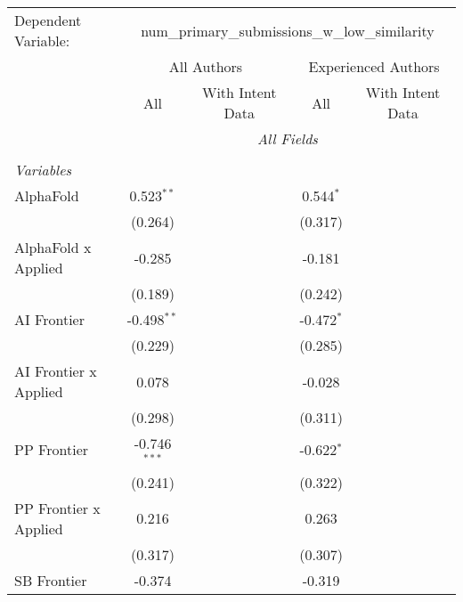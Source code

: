 \begingroup
\centering
\begin{tabular}{lcccccc}
   \tabularnewline \midrule \midrule
   Dependent Variable: & \multicolumn{6}{c}{num\_primary\_submissions\_w\_low\_similarity}\\
 & \multicolumn{3}{c}{All Authors} & \multicolumn{3}{c}{Experienced Authors} \\
\cmidrule(lr){2-4} \cmidrule(lr){5-7}
 & \multicolumn{1}{c}{All} & \multicolumn{2}{c}{With Intent Data} & \multicolumn{1}{c}{All} & \multicolumn{2}{c}{With Intent Data} \\
\cmidrule(lr){2-2} \cmidrule(lr){3-4} \cmidrule(lr){5-5} \cmidrule(lr){6-7}
 & \multicolumn{6}{c}{\textit{All Fields}} \\ \\
   \emph{Variables}\\
   AlphaFold             & 0.523$^{**}$   &         &         & 0.544$^{*}$  &        &   \\   
                         & (0.264)        &         &         & (0.317)      &        &   \\   
   AlphaFold x Applied   & -0.285         &         &         & -0.181       &        &   \\   
                         & (0.189)        &         &         & (0.242)      &        &   \\   
   AI Frontier           & -0.498$^{**}$  &         &         & -0.472$^{*}$ &        &   \\   
                         & (0.229)        &         &         & (0.285)      &        &   \\   
   AI Frontier x Applied & 0.078          &         &         & -0.028       &        &   \\   
                         & (0.298)        &         &         & (0.311)      &        &   \\   
   PP Frontier           & -0.746$^{***}$ &         &         & -0.622$^{*}$ &        &   \\   
                         & (0.241)        &         &         & (0.322)      &        &   \\   
   PP Frontier x Applied & 0.216          &         &         & 0.263        &        &   \\   
                         & (0.317)        &         &         & (0.307)      &        &   \\   
   SB Frontier           & -0.374         &         &         & -0.319       &        &   \\   

\end{tabular}
